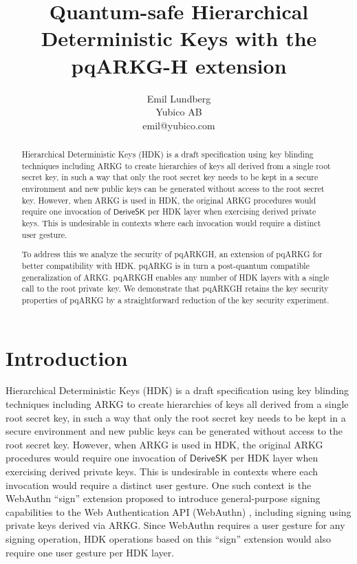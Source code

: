 \documentclass[a4paper,11pt]{article}
\author{Emil Lundberg\\Yubico AB\\emil@yubico.com}
\title{Quantum-safe Hierarchical Deterministic Keys with the pqARKG-H extension}
\newcommand{\ALGNAME}{pqARKG\babelhyphen{nobreak}H\xspace}
\newcommand{\ALGBASE}{pqARKG\xspace}
\newcommand{\algname}[1]{\ensuremath{\mathsf{#1}}\xspace}
\newcommand{\algdsk}{\algname{DeriveSK}}
\begin{document}
\maketitle

\begin{abstract}
Hierarchical Deterministic Keys (HDK) is a draft specification
using key blinding techniques including ARKG
to create hierarchies of keys all derived from a single root secret key,
in such a way that only the root secret key needs to be kept in a secure environment
and new public keys can be generated without access to the root secret key.
However, when ARKG is used in HDK, the original ARKG procedures
would require one invocation of \algdsk per HDK layer when exercising derived private keys.
This is undesirable in contexts where each invocation would require a distinct user gesture.

To address this we analyze the security of \ALGNAME, an extension of \ALGBASE for better compatibility with HDK.
\ALGBASE is in turn a post-quantum compatible generalization of ARKG.
\ALGNAME enables any number of HDK layers with a single call to the root private~key.
We demonstrate that \ALGNAME retains the key security properties of \ALGBASE
by a straightforward reduction of the key security experiment.
\end{abstract}


\section{Introduction}
Hierarchical Deterministic Keys (HDK) \cite{HDK} is a draft specification
using key blinding techniques including ARKG \cite{ARKG}
to create hierarchies of keys all derived from a single root secret key,
in such a way that only the root secret key needs to be kept in a secure environment
and new public keys can be generated without access to the root secret key.
However, when ARKG is used in HDK, the original ARKG procedures
would require one invocation of \algdsk per HDK layer when exercising derived private keys.
This is undesirable in contexts where each invocation would require a distinct user gesture.
One such context is the WebAuthn ``sign'' extension \cite{webauthn-sign}
proposed to introduce general-purpose signing capabilities to the Web Authentication API (WebAuthn) \cite{webauthn},
including signing using private keys derived via ARKG.
Since WebAuthn requires a user gesture for any signing operation,
HDK operations based on this ``sign'' extension would also require one user gesture per HDK layer.
\end{document}
